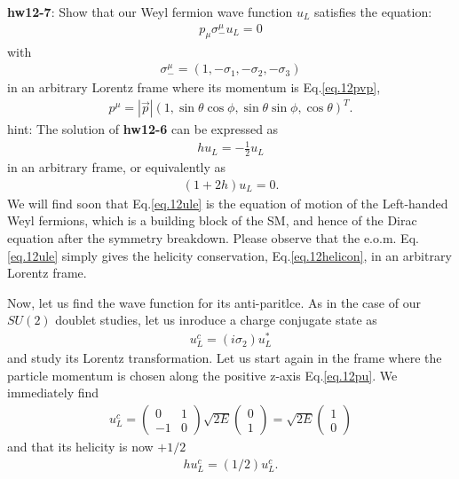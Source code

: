 \documentclass[12pt]{article}
\begin{document}
{\bf hw12-7}: Show that our Weyl fermion wave function $u_L$ satisfies the
  equation:
\begin{eqnarray}
  p_\mu \sigma_-^\mu u_L = 0 \label{eq.12ule}
\end{eqnarray}
 with
\begin{eqnarray}
  \sigma_-^\mu = (1, -\sigma_1, -\sigma_2, -\sigma_3) \label{eq.12_75}
\end{eqnarray}
  in an arbitrary Lorentz frame where its momentum is Eq.\ref{eq.12pvp},
\begin{eqnarray}
  p^\mu
  = |\vec {p}| (1, \sin\theta\cos\phi, \sin\theta\sin\phi, \cos\theta)^T. \label{eq.12pu76}
\end{eqnarray}
hint: The solution of {\bf hw12-6} can be expressed as
\begin{eqnarray}
  h u_L = -\frac{1}{2} u_L \label{eq.12helicon}
\end{eqnarray}
  in an arbitrary frame, or equivalently as
\begin{eqnarray}
  (1 + 2h) u_L = 0.
\end{eqnarray}
  We will find soon that Eq.\ref{eq.12ule} is the equation of motion of the
  Left-handed Weyl fermions, which is a building block of the SM,
  and hence of the Dirac equation after the symmetry breakdown.
  Please observe that the e.o.m. Eq.\ref{eq.12ule} simply gives the helicity
  conservation, Eq.\ref{eq.12helicon}, in an arbitrary Lorentz frame.

  Now, let us find the wave function for its anti-paritlce. As in the
  case of our $SU(2)$ doublet studies, let us inroduce a charge conjugate
  state as
\begin{eqnarray}
  u_L^c = (i\sigma_2) u_L^* \label{eq.12ulcdef}
\end{eqnarray}
  and study its Lorentz transformation. Let us start again in the frame
  where the particle momentum is chosen along the positive z-axis Eq.\ref{eq.12pu}. We immediately find
\begin{eqnarray}
  u_L^c=
  \begin{pmatrix}
    0 & 1 \\ 
    -1 & 0 
  \end{pmatrix}
  \sqrt{2E}
  \begin{pmatrix}
    0 \\ 1
  \end{pmatrix}
  = \sqrt{2E}
  \begin{pmatrix}
    1 \\ 0 
  \end{pmatrix}
\end{eqnarray}
  and that its helicity is now $+1/2$
\begin{eqnarray}
  h u_L^c = (1/2) u_L^c. \label{eq.12hulc}
\end{eqnarray}
\end{document}
